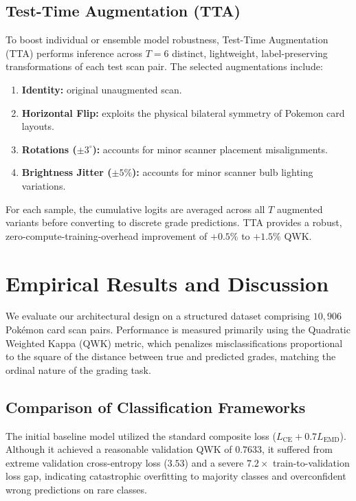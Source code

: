 \documentclass[12pt]{article}
\begin{document}
\subsection{Test-Time Augmentation (TTA)}
To boost individual or ensemble model robustness, Test-Time Augmentation (TTA) performs inference across $T = 6$ distinct, lightweight, label-preserving transformations of each test scan pair. The selected augmentations include:
\begin{enumerate}
  \item \textbf{Identity:} original unaugmented scan.
  \item \textbf{Horizontal Flip:} exploits the physical bilateral symmetry of Pokemon card layouts.
  \item \textbf{Rotations ($\pm 3^\circ$):} accounts for minor scanner placement misalignments.
  \item \textbf{Brightness Jitter ($\pm 5\%$):} accounts for minor scanner bulb lighting variations.
\end{enumerate}
For each sample, the cumulative logits are averaged across all $T$ augmented variants before converting to discrete grade predictions. TTA provides a robust, zero-compute-training-overhead improvement of $+0.5\%$ to $+1.5\%$ QWK.




\section{Empirical Results and Discussion}

We evaluate our architectural design on a structured dataset comprising $10{,}906$ Pokémon card scan pairs. 
Performance is measured primarily using the Quadratic Weighted Kappa (QWK) metric, which penalizes misclassifications proportional to the square of the distance between true and predicted grades, matching the ordinal nature of the grading task.

\subsection{Comparison of Classification Frameworks}
The initial baseline model utilized the standard composite loss ($L_{\text{CE}} + 0.7 L_{\text{EMD}}$). 
Although it achieved a reasonable validation QWK of $0.7633$, it suffered from extreme validation cross-entropy loss ($3.53$) and a severe $7.2\times$ train-to-validation loss gap, indicating catastrophic overfitting to majority classes and overconfident wrong predictions on rare classes.
\end{document}
